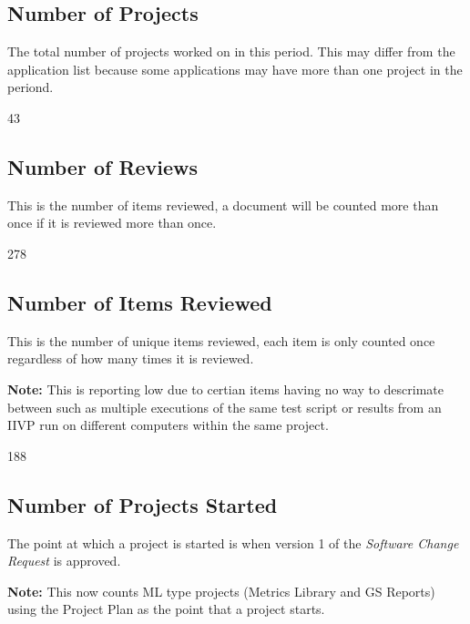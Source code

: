 \documentclass{article}
\begin{document}
\subsection{Number of Projects}
The total number of  projects worked on in this period. This may differ from the
application list because some applications may have more than one project in
the periond.

\begin{Schunk}
\begin{Soutput}
[1] 43
\end{Soutput}
\end{Schunk}

\subsection{Number of Reviews}
This is the number of items reviewed, a document will be counted more than once
if it is reviewed more than once.

\begin{Schunk}
\begin{Soutput}
[1] 278
\end{Soutput}
\end{Schunk}

\subsection{Number of Items Reviewed}
This is the number of unique items reviewed, each item is only counted once
regardless of how many times it is reviewed.

\textbf{Note:} This is reporting low due to certian items having no way to
descrimate between such as multiple executions of the same test script or
results from an IIVP run on different computers within the same project.

\begin{Schunk}
\begin{Soutput}
[1] 188
\end{Soutput}
\end{Schunk}

\subsection{Number of Projects Started}
The point at which a project is started is when version 1 of the \textit{Software
Change Request} is approved.

\textbf{Note:} This now counts ML type projects (Metrics Library and GS Reports)
using the Project Plan as the point that a project starts.
\end{document}
